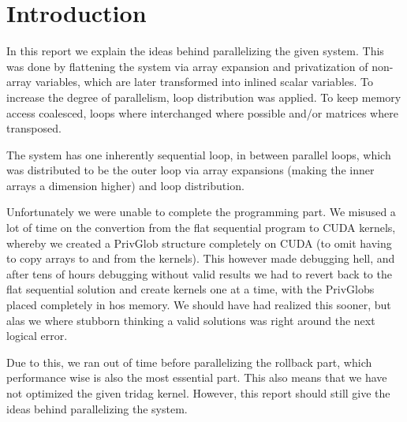 \section{Introduction}
In this report we explain the ideas behind parallelizing the given system. This was done by flattening the system via array expansion and privatization of non-array variables, which are later transformed into inlined scalar variables. To increase the degree of parallelism, loop distribution was applied. To keep memory access coalesced, loops where interchanged where possible and/or matrices where transposed. 

The system has one inherently sequential loop, in between parallel loops, which was distributed to be the outer loop via array expansions (making the inner arrays a dimension higher) and loop distribution.

Unfortunately we were unable to complete the programming part. We misused a lot of time on the convertion from the flat sequential program to CUDA kernels, whereby we created a PrivGlob structure completely on CUDA (to omit having to copy arrays to and from the kernels). This however made debugging hell, and after tens of hours debugging without valid results we had to revert back to the flat sequential solution and create kernels one at a time, with the PrivGlobs placed completely in hos memory. We should have had realized this sooner, but alas we where stubborn thinking a valid solutions was right around the next logical error.

Due to this, we ran out of time before parallelizing the rollback part, which performance wise is also the most essential part. This also means that we have not optimized the given tridag kernel. However, this report should still give the ideas behind parallelizing the system.